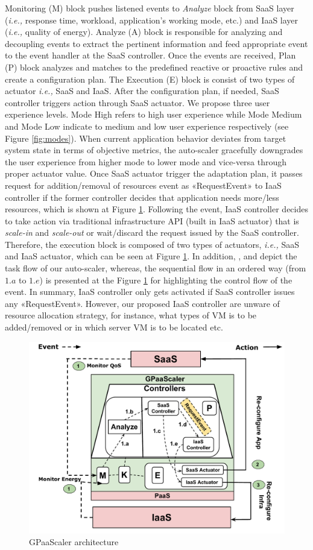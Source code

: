 Monitoring (M) block pushes listened events to \emph{Analyze} block from SaaS layer (\emph{i.e.,} response time, workload, application's working mode, etc.) and IaaS layer (\emph{i.e.,} quality of energy). Analyze (A) block is responsible for analyzing and decoupling events to extract the pertinent information and feed appropriate event to the event handler at the SaaS controller. Once the events are 
received, Plan (P) block analyzes and matches to the predefined reactive or proactive rules and create a
configuration plan. The Execution (E) block is consist of two types of actuator \emph{i.e.,} SaaS and IaaS.
After the configuration plan, if needed, SaaS controller triggers action through SaaS actuator.
We propose three user experience levels. Mode High refers to high user
experience while Mode Medium and Mode Low indicate to medium and low user experience respectively (see Figure \ref{fig:modes}). When current application behavior deviates from target system state in terms of objective metrics, the auto-scaler gracefully downgrades the user experience from higher mode to lower mode and vice-versa through proper actuator value. Once SaaS actuator trigger the adaptation plan, it passes request for addition/removal of resources event as «RequestEvent» to IaaS controller if the former controller decides that application needs more/less resources, which is shown at Figure \ref{fig:GPaaScaler}. Following the event, IaaS controller decides to take action via traditional infrastructure API (built in IaaS actuator) that is \emph{scale-in} and \emph{scale-out} or wait/discard the request issued by the SaaS controller. Therefore, the execution block is composed of two types of actuators, \emph{i.e.,} SaaS and IaaS actuator, which can be seen at Figure \ref{fig:GPaaScaler}. In addition, ,  and  depict the task flow of our auto-scaler, 
whereas, the sequential flow in an ordered way (from $1.a$ to $1.e$) is presented at the Figure \ref{fig:GPaaScaler} for highlighting the control flow of the event.
In summary, IaaS controller only gets activated if SaaS controller issues any «RequestEvent». However, our proposed IaaS controller are unware of resource allocation strategy, for instance, what types of VM is to be added/removed or in which server VM is to be located etc.  




\begin{figure} [ht]
\centering
\includegraphics[scale=.35]{Graphs/test_gpaascaler.pdf}
\caption{GPaaScaler architecture}
\label{fig:GPaaScaler}
\end{figure}


